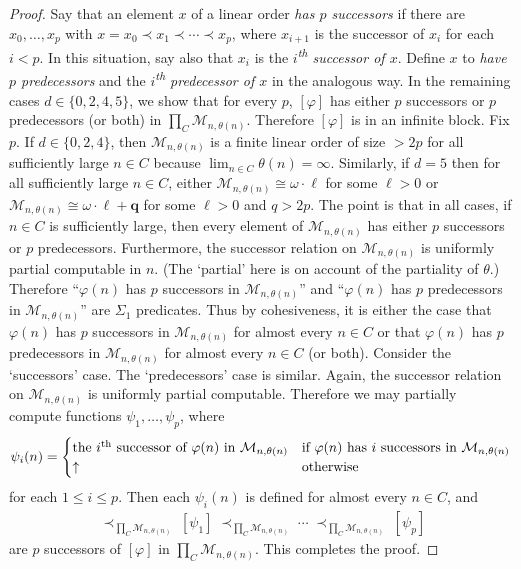 \documentclass[11pt,a4paper,reqno]{amsart}
\theoremstyle{definition}
\newcommand{\ua}{{\uparrow}}
\newcommand{\iso}{\cong}
\newcommand{\mc}[1]{\mathcal{#1}}
\begin{document}
\begin{proof}
Say that an element $x$ of a linear order \emph{has $p$ successors} if there are $x_0, \dots, x_p$ with $x = x_0 \prec x_1 \prec \cdots \prec x_p$, where $x_{i+1}$ is the successor of $x_i$ for each $i < p$.  In this situation, say also that $x_i$ is the \emph{$i$\textsuperscript{th} successor of $x$}.  Define $x$ to \emph{have $p$ predecessors} and the \emph{$i$\textsuperscript{th} predecessor of $x$} in the analogous way.  In the remaining cases $d \in \{0,2,4,5\}$, we show that for every $p$, $[\varphi]$ has either $p$ successors or $p$ predecessors (or both) in $\prod_C \mc{M}_{n,\theta(n)}$.  Therefore $[\varphi]$ is in an infinite block.  Fix $p$.  If $d \in \{0,2,4\}$, then $\mc{M}_{n,\theta(n)}$ is a finite linear order of size $> 2p$ for all sufficiently large $n \in C$ because $\lim_{n \in C}\theta(n) = \infty$.  Similarly, if $d = 5$ then for all sufficiently large $n \in C$, either $\mc{M}_{n,\theta(n)} \iso \omega\cdot\bm{\ell}$ for some $\ell > 0$ or $\mc{M}_{n,\theta(n)} \iso \omega\cdot\bm{\ell} + \bm{q}$ for some $\ell > 0$ and $q > 2p$.  The point is that in all cases, if $n \in C$ is sufficiently large, then every element of $\mc{M}_{n,\theta(n)}$ has either $p$ successors or $p$ predecessors.  Furthermore, the successor relation on $\mc{M}_{n,\theta(n)}$ is uniformly partial computable in $n$.  (The `partial' here is on account of the partiality of $\theta$.)  Therefore ``$\varphi(n)$ has $p$ successors in $\mc{M}_{n,\theta(n)}$'' and ``$\varphi(n)$ has $p$ predecessors in $\mc{M}_{n,\theta(n)}$'' are $\Sigma_1$ predicates.  Thus by cohesiveness, it is either the case that $\varphi(n)$ has $p$ successors in $\mc{M}_{n,\theta(n)}$ for almost every $n \in C$ or that $\varphi(n)$ has $p$ predecessors in $\mc{M}_{n,\theta(n)}$ for almost every $n \in C$ (or both).  Consider the `successors' case.  The `predecessors' case is similar.  Again, the successor relation on $\mc{M}_{n,\theta(n)}$ is uniformly partial computable.  Therefore we may partially compute functions $\psi_1, \dots, \psi_p$, where
\begin{align*}
\psi_i(n) =
\begin{cases}
\text{the $i$\textsuperscript{th} successor of $\varphi(n)$ in $\mc{M}_{n,\theta(n)}$} & \text{if $\varphi(n)$ has $i$ successors in $\mc{M}_{n,\theta(n)}$}\\
\ua & \text{otherwise}
\end{cases}
\end{align*}
for each $1 \leq i \leq p$.  Then each $\psi_i(n)$ is defined for almost every $n \in C$, and
\begin{align*}
[\varphi] \;\prec_{\prod_C \mc{M}_{n,\theta(n)}}\; [\psi_1] \;\prec_{\prod_C \mc{M}_{n,\theta(n)}}\; \cdots \;\prec_{\prod_C \mc{M}_{n,\theta(n)}}\; [\psi_p]
\end{align*}
are $p$ successors of $[\varphi]$ in $\prod_C \mc{M}_{n,\theta(n)}$.  This completes the proof.
\end{proof}
\end{document}
